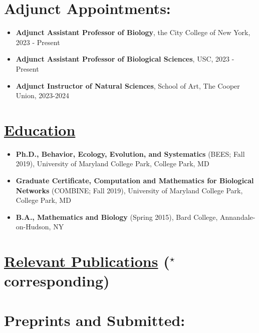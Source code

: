 \documentclass[]{res}
\begin{document}
\begin{resume}
\begin{itemize}[leftmargin=*]
 \section{Adjunct Appointments:}
\begin{itemize}[leftmargin=*]
\setlength\itemsep{0.5em}
\item[] {\bf Adjunct Assistant Professor of Biology}, the City College of New York, 2023 - Present
\item[] {\bf Adjunct Assistant Professor of Biological Sciences}, USC, 2023 - Present
\item[] {\bf Adjunct Instructor of Natural Sciences}, School of Art, The Cooper Union, 2023-2024
\end{itemize}

\section{\underline{Education}} %

\begin{itemize}[leftmargin=*]
\setlength\itemsep{0.5em}
\item[] {\bf Ph.D., Behavior, Ecology, Evolution, and Systematics} (BEES; Fall 2019),
University of Maryland College Park, College Park, MD

\item[] {\bf Graduate Certificate, Computation and Mathematics for Biological Networks} (COMBINE; Fall 2019),
University of Maryland College Park, College Park, MD

\item[]  {\bf B.A., Mathematics and Biology}  (Spring 2015), Bard College, Annandale-on-Hudson, NY
\end{itemize}


 \end{itemize}
 

 
 \section{\underline{Relevant Publications} ($^\star$corresponding)} \vspace{2mm}

 
\section{Preprints and Submitted:} \vspace{0mm}
  

\end{resume}
\end{document}
